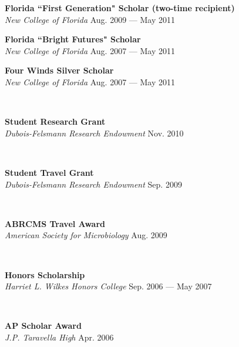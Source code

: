 \documentclass[a4paper,12pt]{article}
\newcommand{\ressubheading}[4]{{\begin{minipage}{\textwidth}
        \textbf{#1} \hfill #2 \\
        \textit{#3} \hfill #4 \\
        \end{minipage}}}
\begin{document}
    \ressubheading{Florida ``First Generation" Scholar {\normalfont(two-time recipient)}}{}{New College of Florida}{Aug. 2009 --- May 2011}

    \ressubheading{Florida ``Bright Futures" Scholar}{}{New College of Florida}{Aug. 2007 --- May 2011}

    \ressubheading{Four Winds Silver Scholar}{}{New College of Florida}{Aug. 2007 --- May 2011}\
    
    
    \ressubheading{Student Research Grant}{}{Dubois-Felsmann Research Endowment}{Nov. 2010}\
    
    \ressubheading{Student Travel Grant}{}{Dubois-Felsmann Research Endowment}{Sep. 2009}\
    
    \ressubheading{ABRCMS Travel Award}{}{American Society for Microbiology}{Aug. 2009}\
    
    \ressubheading{Honors Scholarship}{}{Harriet L. Wilkes Honors College}{Sep. 2006 --- May 2007}\
    
    \ressubheading{AP Scholar Award}{}{J.P. Taravella High}{Apr. 2006}
\end{document}
